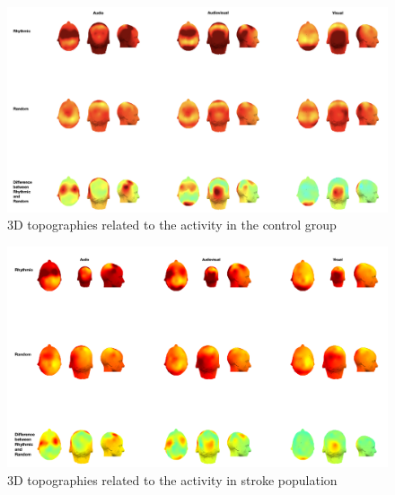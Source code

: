 \begin{figure}[htbp]
        \includegraphics[width=1\textwidth]{healthy_images/3d_topo.png}
        \caption{3D topographies related to the activity in the control group}
        \label{fig: 3D topographies control group} 
\end{figure}
\begin{figure}
    \includegraphics[width=1\textwidth]{stroke_images/3d_topographies.png}
        \caption{3D topographies related to the activity in stroke population}
        \label{fig: 3D topographies stroke group}   
\end{figure}

\clearpage
